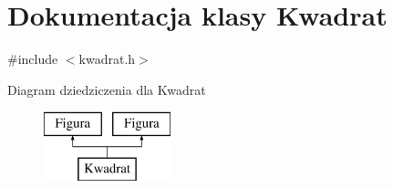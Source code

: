 \hypertarget{classKwadrat}{\section{Dokumentacja klasy Kwadrat}
\label{classKwadrat}
}


{\ttfamily \#include $<$kwadrat.\-h$>$}

Diagram dziedziczenia dla Kwadrat\begin{figure}[H]
\begin{center}
\leavevmode
\includegraphics[height=2.000000cm]{classKwadrat}
\end{center}
\end{figure}
